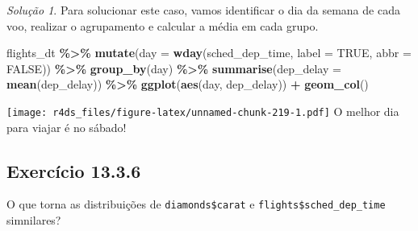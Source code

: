 \documentclass[
]{latex/krantz}
\newenvironment{Shaded}{\begin{snugshade}}{\end{snugshade}}
\newcommand{\AttributeTok}[1]{\textcolor[rgb]{0.13,0.29,0.53}{#1}}
\newcommand{\ConstantTok}[1]{\textcolor[rgb]{0.56,0.35,0.01}{#1}}
\newcommand{\FunctionTok}[1]{\textcolor[rgb]{0.13,0.29,0.53}{\textbf{#1}}}
\newcommand{\NormalTok}[1]{#1}
\newcommand{\SpecialCharTok}[1]{\textcolor[rgb]{0.81,0.36,0.00}{\textbf{#1}}}
\theoremstyle{definition}
\theoremstyle{definition}
\theoremstyle{definition}
\theoremstyle{definition}
\theoremstyle{remark}
\newtheorem*{solution}{Solução}
\begin{document}
\begin{solution}
Para solucionar este caso, vamos identificar o dia da semana de cada voo, realizar o agrupamento e calcular a média em cada grupo.

\begin{Shaded}
\begin{Highlighting}[]
\NormalTok{flights\_dt }\SpecialCharTok{\%\textgreater{}\%}
  \FunctionTok{mutate}\NormalTok{(}\AttributeTok{day =} \FunctionTok{wday}\NormalTok{(sched\_dep\_time, }\AttributeTok{label =} \ConstantTok{TRUE}\NormalTok{, }\AttributeTok{abbr =} \ConstantTok{FALSE}\NormalTok{)) }\SpecialCharTok{\%\textgreater{}\%}
  \FunctionTok{group\_by}\NormalTok{(day) }\SpecialCharTok{\%\textgreater{}\%}
  \FunctionTok{summarise}\NormalTok{(}\AttributeTok{dep\_delay =} \FunctionTok{mean}\NormalTok{(dep\_delay)) }\SpecialCharTok{\%\textgreater{}\%}
  \FunctionTok{ggplot}\NormalTok{(}\FunctionTok{aes}\NormalTok{(day, dep\_delay)) }\SpecialCharTok{+}
    \FunctionTok{geom\_col}\NormalTok{()}
\end{Highlighting}
\end{Shaded}

\texttt{[image: r4ds\_files/figure-latex/unnamed-chunk-219-1.pdf]}
O melhor dia para viajar é no sábado!
\end{solution}

\hypertarget{exr13-3-6}{%
\subsection*{Exercício 13.3.6}\label{exr13-3-6}}

O que torna as distribuições de \texttt{diamonds\$carat} e \texttt{flights\$sched\_dep\_time} simnilares?
\end{document}
